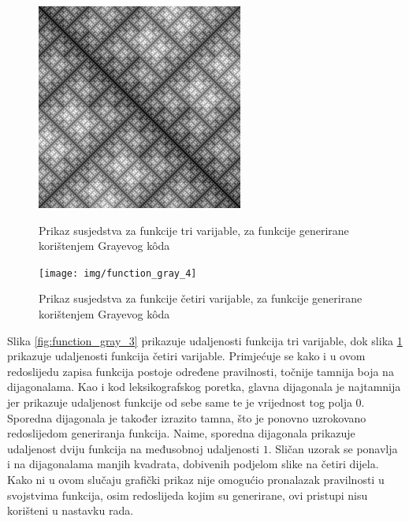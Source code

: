 \begin{figure}[!ht]
    \centering
    \begin{minipage}{.5\textwidth}
        \centering
        \includegraphics[width=.95\textwidth]{img/function_gray_3}
        \captionsetup{justification=centering}
        \caption{Prikaz susjedstva za funkcije tri varijable, za funkcije generirane korištenjem Grayevog k\^oda}
        \label{fig:function_gray_3}
    \end{minipage}%
    \begin{minipage}{.5\textwidth}
        \centering
        \texttt{[image: img/function\_gray\_4]}
        \captionsetup{justification=centering}
        \caption{Prikaz susjedstva za funkcije četiri varijable, za funkcije generirane korištenjem Grayevog k\^oda}
        \label{fig:function_gray_4}
    \end{minipage}
\end{figure}


Slika \ref{fig:function_gray_3} prikazuje udaljenosti funkcija tri varijable, dok slika \ref{fig:function_gray_4} prikazuje udaljenosti funkcija četiri varijable.
Primjećuje se kako i u ovom redoslijedu zapisa funkcija postoje određene pravilnosti, točnije tamnija boja na dijagonalama.
Kao i kod leksikografskog poretka, glavna dijagonala je najtamnija jer prikazuje udaljenost funkcije od sebe same te je vrijednost tog polja $0$.
Sporedna dijagonala je također izrazito tamna, što je ponovno uzrokovano redoslijedom generiranja funkcija.
Naime, sporedna dijagonala prikazuje udaljenost dviju funkcija na međusobnoj udaljenosti $1$.
Sličan uzorak se ponavlja i na dijagonalama manjih kvadrata, dobivenih podjelom slike na četiri dijela.
Kako ni u ovom slučaju grafički prikaz nije omogućio pronalazak pravilnosti u svojstvima funkcija, osim redoslijeda kojim su generirane, ovi pristupi nisu korišteni u nastavku rada.

